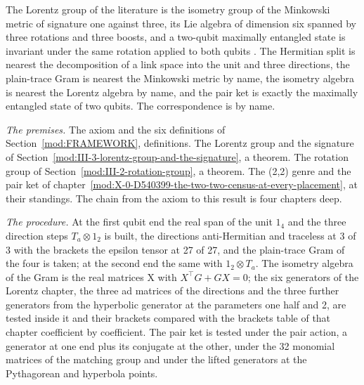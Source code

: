 \begin{chbridge}
The Lorentz group of the literature is the isometry group of the Minkowski metric of signature one against three, its Lie algebra of dimension six spanned by three rotations and three boosts, and a two-qubit maximally entangled state is invariant under the same rotation applied to both qubits \cite{Minkowski1908,Wigner1939,Nielsen2000}. The Hermitian split is nearest the decomposition of a link space into the unit and three directions, the plain-trace Gram is nearest the Minkowski metric by name, the isometry algebra is nearest the Lorentz algebra by name, and the pair ket is exactly the maximally entangled state of two qubits. The correspondence is by name.
\end{chbridge}
\begin{chproof}
\textit{The premises.} The axiom and the six definitions of Section~\ref{mod:FRAMEWORK}, definitions. The Lorentz group and the signature of Section~\ref{mod:III-3-lorentz-group-and-the-signature}, a theorem. The rotation group of Section~\ref{mod:III-2-rotation-group}, a theorem. The (2,2) genre and the pair ket of chapter~\ref{mod:X-0-D540399-the-two-two-census-at-every-placement}, at their standings. The chain from the axiom to this result is four chapters deep.

\textit{The procedure.} At the first qubit end the real span of the unit $1_4$ and the three direction steps $T_a \otimes 1_2$ is built, the directions anti-Hermitian and traceless at 3 of 3 with the brackets the epsilon tensor at 27 of 27, and the plain-trace Gram of the four is taken; at the second end the same with $1_2 \otimes T_a$. The isometry algebra of the Gram is the real matrices X with $X^{\top}G + GX = 0$; the six generators of the Lorentz chapter, the three ad matrices of the directions and the three further generators from the hyperbolic generator at the parameters one half and 2, are tested inside it and their brackets compared with the brackets table of that chapter coefficient by coefficient. The pair ket is tested under the pair action, a generator at one end plus its conjugate at the other, under the 32 monomial matrices of the matching group and under the lifted generators at the Pythagorean and hyperbola points.


\end{chproof}
